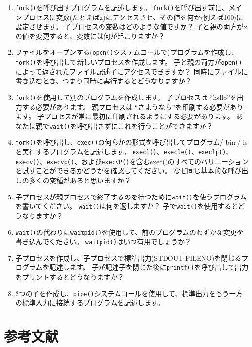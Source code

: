\begin{enumerate}
\def\labelenumi{\arabic{enumi}.}
\tightlist
\item
  \texttt{fork()}を呼び出すプログラムを記述します。
  \texttt{fork()}を呼び出す前に、メインプロセスに変数(たとえばx)にアクセスさせ、その値を何か(例えば100)に設定させます。
  子プロセスの変数はどのような値ですか？
  子と親の両方がxの値を変更すると、変数には何が起こりますか？
\item
  ファイルをオープンする(\texttt{open()}システムコールで)プログラムを作成し、\texttt{fork()}を呼び出して新しいプロセスを作成します。
  子と親の両方が\texttt{open()}によって返されたファイル記述子にアクセスできますか？
  同時にファイルに書き込むとき、つまり同時に実行するとどうなりますか？
\item
  \texttt{fork()}を使用して別のプログラムを作成します。 子プロセスは
  ``hello''を出力する必要があります。 親プロセスは
  ``さようなら''を印刷する必要があります。
  子プロセスが常に最初に印刷されるようにする必要があります。
  あなたは親で\texttt{wait()}を呼び出さずにこれを行うことができますか？
\item
  \texttt{fork()}を呼び出し、\texttt{exec()}の何らかの形式を呼び出してプログラム/
  bin / lsを実行するプログラムを記述します。
  \texttt{execl()}、\texttt{execle()}、\texttt{execlp()}、\texttt{execv()}、\texttt{execvp()}、および\texttt{execvP()}を含むexec()のすべてのバリエーションを試すことができるかどうかを確認してください。
  なぜ同じ基本的な呼び出しの多くの変種があると思いますか？
\item
  子プロセスが親プロセスで終了するのを待つために\texttt{wait()}を使うプログラムを書いてください。
  \texttt{wait()}は何を返しますか？
  子で\texttt{wait()}を使用するとどうなりますか？
\item
  \texttt{Wait()}の代わりに\texttt{waitpid()}を使用して、前のプログラムのわずかな変更を書き込んでください。
  \texttt{waitpid()}はいつ有用でしょうか？
\item
  子プロセスを作成し、子プロセスで標準出力(STDOUT
  FILENO)を閉じるプログラムを記述します。
  子が記述子を閉じた後に\texttt{printf()}を呼び出して出力をプリントするとどうなりますか？
\item
  2つの子を作成し、\texttt{pipe()}システムコールを使用して、標準出力をもう一方の標準入力に接続するプログラムを記述します。
\end{enumerate}

\hypertarget{ux53c2ux8003ux6587ux732e-1}{%
\section*{参考文献}\label{ux53c2ux8003ux6587ux732e-1}}


